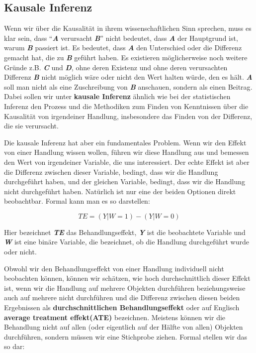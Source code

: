 \documentclass[12pt,a4paper,twoside]{scrartcl}
\numberwithin{equation}{section}
\begin{document}
  	\subsection{Kausale Inferenz}\label{subsec:kausalität}
  	Wenn wir über die Kausalität in ihrem wissenschaftlichen Sinn sprechen, muss es klar sein, dass \enquote{\textbf{\textit{A}} verursacht \textbf{\textit{B}}} nicht bedeutet, dass \textbf{\textit{A}} der Hauptgrund ist, warum \textbf{\textit{B}} passiert ist. Es bedeutet, dass \textbf{\textit{A}} den Unterschied oder die Differenz gemacht hat, die zu \textbf{\textit{B}} geführt haben. Es existieren möglicherweise noch weitere Gründe z.B. \textbf{\textit{C}} und \textbf{\textit{D}}, ohne deren Existenz und ohne deren verursachten Differenz \textbf{\textit{B}} nicht möglich wäre oder nicht den Wert halten würde, den es hält. \textbf{\textit{A}} soll man nicht als eine Zuschreibung von \textbf{\textit{B}} anschauen, sondern als einen Beitrag\cite{MacHum}.  Dabei sollen wir unter \textbf{kausale Inferenz} ähnlich wie bei der statistischen Inferenz den Prozess und die Methodiken zum Finden von Kenntnissen über die Kausalität von irgendeiner Handlung, insbesondere das Finden von der Differenz, die sie verursacht.\par
  	

\noindent	
Die kausale Inferenz hat aber ein fundamentales Problem. Wenn wir den Effekt von einer Handlung wissen wollen, führen wir diese Handlung aus und bemessen den Wert von irgendeiner Variable, die uns interessiert. Der echte Effekt ist aber die Differenz zwischen dieser Variable, bedingt, dass wir die Handlung durchgeführt haben, und der gleichen Variable, bedingt, dass wir die Handlung nicht durchgeführt haben\cite{holland1986statistics}. Natürlich ist nur eine der beiden Optionen direkt beobachtbar. Formal kann man es so darstellen: \par
  	
\begin{equation}
  TE = (Y|W = 1) - (Y|W = 0)
\end{equation}  	
  	
\noindent	  	
Hier bezeichnet \textbf{\textit{TE}} das Behandlungseffekt, \textbf{\textit{Y}} ist die beobachtete Variable und \textbf{\textit{W}} ist eine binäre Variable, die bezeichnet, ob die Handlung durchgeführt wurde oder nicht.\par

\noindent	  	
Obwohl wir den Behandlungseffekt von einer Handlung individuell nicht beobachten können, können wir schätzen, wie hoch durchschnittlich dieser Effekt ist, wenn wir die Handlung auf mehrere Objekten durchführen beziehungsweise auch auf mehrere nicht durchführen und die Differenz zwischen diesen beiden Ergebnissen als \textbf{durchschnittlichen Behandlungseffekt} oder auf Englisch \textbf{average treatment effekt(ATE)} bezeichnen. Meistens können wir die Behandlung nicht auf allen (oder eigentlich auf der Hälfte von allen) Objekten durchführen, sondern müssen wir eine Stichprobe ziehen.  Formal stellen wir das so dar: \par
\end{document}
